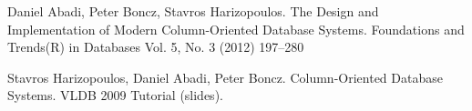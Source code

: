 \documentclass{beamer}
\begin{document}
\begin{frame}[allowframebreaks]
{\begin{thebibliography}{99}




 Daniel Abadi, Peter Boncz, Stavros Harizopoulos. The Design and Implementation of Modern Column-Oriented Database Systems. Foundations and Trends(R) in Databases Vol. 5, No. 3 (2012) 197--280

 Stavros Harizopoulos, Daniel Abadi, Peter Boncz. Column-Oriented Database Systems. VLDB 2009 Tutorial (slides).







\end{thebibliography}}
\end{frame}
\end{document}

